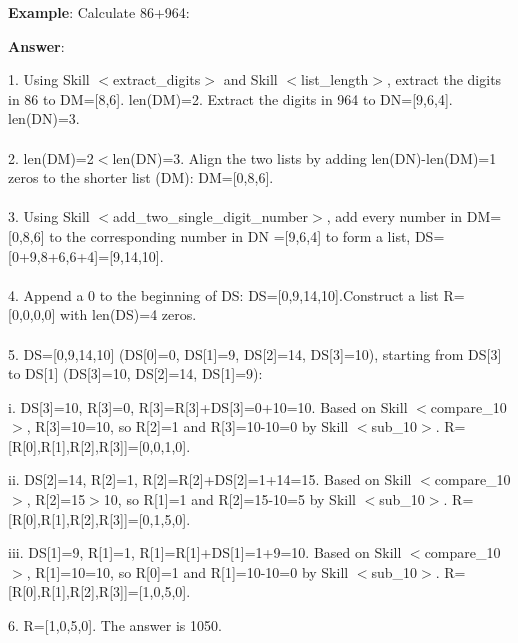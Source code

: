 \documentclass{article} %
\begin{document}
\newpage

\begin{tcolorbox}[title = {An Example of Skill Composition for Addition}, colback = Apricot!25!white, colframe = BrickRed!75!black] 
\textbf{Example}: Calculate 86+964: 

\quad

\textbf{Answer}:

1. Using Skill $<$extract\_digits$>$ and Skill $<$list\_length$>$, extract the digits in 86 to DM=[8,6]. len(DM)=2. Extract the digits in 964 to DN=[9,6,4]. len(DN)=3. \\ \\
2. len(DM)=2$<$len(DN)=3. Align the two lists by adding len(DN)-len(DM)=1 zeros to the shorter list (DM): DM=[0,8,6]. \\ \\
3. Using Skill $<$add\_two\_single\_digit\_number$>$, add every number in DM=[0,8,6] to the corresponding number in DN =[9,6,4] to form a list, DS=[0+9,8+6,6+4]=[9,14,10]. \\ \\
4. Append a 0 to the beginning of DS: DS=[0,9,14,10].Construct a list R=[0,0,0,0] with len(DS)=4 zeros.  \\ \\
5.  DS=[0,9,14,10] (DS[0]=0, DS[1]=9, DS[2]=14, DS[3]=10), starting from DS[3] to DS[1] (DS[3]=10, DS[2]=14, DS[1]=9): 

\quad 

    \qquad i. DS[3]=10, R[3]=0, R[3]=R[3]+DS[3]=0+10=10. Based on Skill $<$compare\_10$>$, R[3]=10=10, so R[2]=1 and R[3]=10-10=0 by Skill $<$sub\_10$>$. R=[R[0],R[1],R[2],R[3]]=[0,0,1,0]. 

    
    \qquad ii. DS[2]=14, R[2]=1, R[2]=R[2]+DS[2]=1+14=15. Based on Skill $<$compare\_10$>$, R[2]=15$>$10, so R[1]=1 and R[2]=15-10=5 by Skill $<$sub\_10$>$. R=[R[0],R[1],R[2],R[3]]=[0,1,5,0]. 

    
     \qquad iii. DS[1]=9, R[1]=1, R[1]=R[1]+DS[1]=1+9=10. Based on Skill $<$compare\_10$>$, R[1]=10=10, so R[0]=1 and R[1]=10-10=0 by Skill $<$sub\_10$>$. R=[R[0],R[1],R[2],R[3]]=[1,0,5,0]. 

\quad 

6. R=[1,0,5,0]. The answer is 1050.           
\end{tcolorbox}
\noindent\begin{minipage}{\textwidth}
 \label{Tab:compose_simple_add_skill}
\end{minipage}
\end{document}
